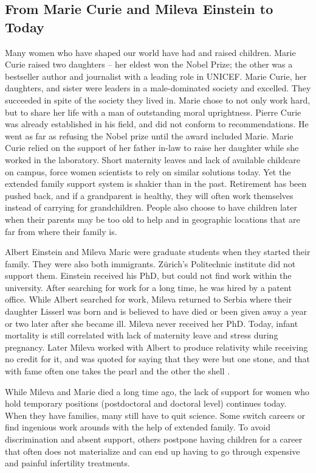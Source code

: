 \documentclass[utf8]{frontiersSCNS} %
\begin{document}
\subsection{From Marie Curie and Mileva Einstein to Today}
\label{Sec9}
Many women who have shaped our world have had and raised children.  Marie Curie raised two daughters -- her eldest won the Nobel Prize; the other was a bestseller author and journalist with a leading role in UNICEF. Marie Curie, her daughters, and sister were leaders in a male-dominated society and excelled. They succeeded in spite of the society they lived in. Marie chose to not only work hard, but to share her life with a man of outstanding moral uprightness. Pierre Curie was already established in his field, and did not conform to recommendations. He went as far as refusing the Nobel prize until the award included Marie. Marie Curie relied on the support of her father in-law to raise her daughter while she worked in the laboratory. Short maternity leaves and lack of available childcare on campus, force women scientists to rely on similar solutions today. Yet the extended family support system is shakier than in the past. Retirement has been pushed back, and if a grandparent is healthy, they will often work themselves instead of carrying for grandchildren. People also choose to have children later when their parents may be too old to help and in geographic locations that are far from where their family is. 

Albert Einstein and Mileva Maric were graduate students when they started their family. They were also both immigrants. Z\"{u}rich's Politechnic institute did not support them. Einstein received his PhD, but could not find work within the university. After searching for work for a long time, he was hired by a patent office. While Albert searched for work, Mileva returned to Serbia where their daughter Lisserl was born and is believed to have died or been given away a year or two later after she became ill. Mileva never received her PhD. Today, infant mortality is still correlated with lack of maternity leave and stress during pregnancy. Later Mileva worked with Albert to produce relativity while receiving no credit for it, and was quoted for saying that they were but one stone, and that with fame often one takes the pearl and the other the shell \citep{Mileva}. 

While Mileva and Marie died a long time ago, the lack of support for women who hold temporary positions  (postdoctoral and doctoral level) continues today. When they have families, many still have to quit science. Some switch careers or find ingenious work arounds with the help of extended family. To avoid discrimination and absent support, others postpone having children for a career that often does not materialize and can end up having to go through expensive and painful infertility treatments. 
\end{document}
